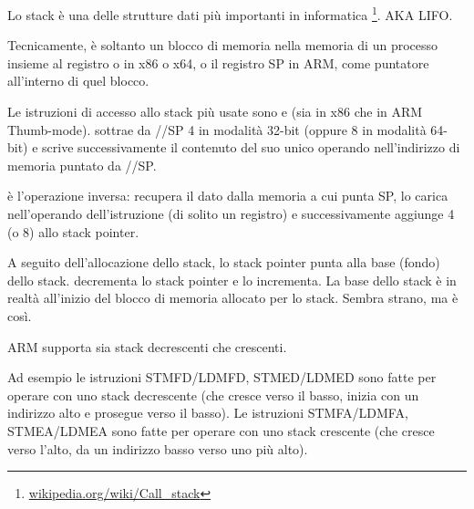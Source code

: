 \mysection{\Stack}
\label{sec:stack}
\myindex{\Stack}

Lo stack è una delle strutture dati più importanti in informatica
\footnote{\href{http://go.yurichev.com/17119}{wikipedia.org/wiki/Call\_stack}}.
\ac{AKA} \ac{LIFO}.

Tecnicamente, è soltanto un blocco di memoria nella memoria di un processo insieme al registro \ESP o \RSP in x86 o x64, o il registro \ac{SP} in ARM, come puntatore all'interno di quel blocco.

Le istruzioni di accesso allo stack più usate sono \PUSH e \POP (sia in x86 che in ARM Thumb-mode).
\PUSH sottrae da \ESP/\RSP/\ac{SP} 4 in modalità 32-bit (oppure 8 in modalità 64-bit) e scrive successivamente il contenuto del suo unico operando nell'indirizzo di memoria puntato da \ESP/\RSP/\ac{SP}.

\POP è l'operazione inversa: recupera il dato dalla memoria a cui punta \ac{SP}, lo carica nell'operando dell'istruzione (di solito un registro)
e successivamente aggiunge 4 (o 8) allo \gls{stack pointer}.

A seguito dell'allocazione dello stack, lo \gls{stack pointer} punta alla base (fondo) dello stack.
\PUSH decrementa lo \gls{stack pointer} e \POP lo incrementa.
La base dello stack è in realtà all'inizio del blocco di memoria allocato per lo stack. Sembra strano, ma è così.

ARM supporta sia stack decrescenti che crescenti.


Ad esempio le istruzioni \ac{STMFD}/\ac{LDMFD}, \ac{STMED}/\ac{LDMED} sono fatte per operare con uno stack decrescente (che cresce verso il basso, inizia con un indirizzo alto e prosegue verso il basso).
Le istruzioni \ac{STMFA}/\ac{LDMFA}, \ac{STMEA}/\ac{LDMEA} sono fatte per operare con uno stack crescente (che cresce verso l'alto, da un indirizzo basso verso uno più alto).


